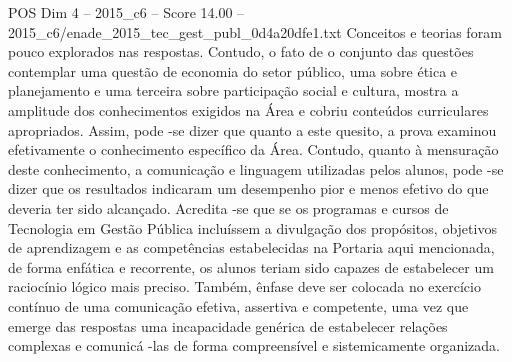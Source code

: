 \begin{textsample}{POS Dim 4 – 2015\_c6 – Score 14.00 – 2015\_c6/enade\_2015\_tec\_gest\_publ\_0d4a20dfe1.txt}
Conceitos e teorias foram pouco explorados nas respostas.
Contudo, o fato de o conjunto das questões contemplar uma questão de economia do setor público, uma sobre ética e planejamento e uma terceira sobre participação social e cultura, mostra a amplitude dos conhecimentos exigidos na Área e cobriu conteúdos curriculares apropriados.
Assim, pode -se dizer que quanto a este quesito, a prova examinou efetivamente o conhecimento específico da Área.
Contudo, quanto à mensuração deste conhecimento, a comunicação e linguagem utilizadas pelos alunos, pode -se dizer que os resultados indicaram um desempenho pior e menos efetivo do que deveria ter sido alcançado.
Acredita -se que se os programas e cursos de Tecnologia em Gestão Pública incluíssem a divulgação dos propósitos, objetivos de aprendizagem e as competências estabelecidas na Portaria aqui mencionada, de forma enfática e recorrente, os alunos teriam sido capazes de estabelecer um raciocínio lógico mais preciso.
Também, ênfase deve ser colocada no exercício contínuo de uma comunicação efetiva, assertiva e competente, uma vez que emerge das respostas uma incapacidade genérica de estabelecer relações complexas e comunicá -las de forma compreensível e sistemicamente organizada.

\end{textsample}
